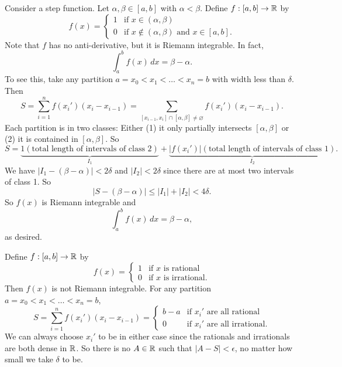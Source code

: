 \begin{example}
  Consider a step function.
  Let $\alpha, \beta \in [a, b]$ with $\alpha < \beta$.
  Define $f : [a, b] \to \mathbb{R}$ by
  \[
    f(x) = \begin{cases}
      1 & \text{if } x \in (\alpha, \beta) \\
      0 & \text{if } x \notin (\alpha, \beta) \text{ and } x \in [a, b].
    \end{cases}
  \]
  Note that $f$ has no anti-derivative, but it
  is Riemann integrable. In fact,
  \[
    \int_a^b f(x)\, dx = \beta - \alpha.
  \]
  To see this, take any partition
  $a = x_0 < x_1 < \dots < x_n = b$ with width less
  than $\delta$. Then
  \[
    S = \sum_{i = 1}^n f(x_i') (x_i - x_{i - 1}) =
    \sum_{[x_{i - 1}, x_i] \cap [\alpha, \beta] \ne \varnothing} f(x_i') (x_i - x_{i - 1}).
  \]
  Each partition is in two classes: Either (1) it
  only partially intersects $[\alpha, \beta]$ or (2)
  it is contained in $[\alpha, \beta]$. So
  \[
    S = \underbrace{1 (\text{total length of intervals of class 2})}_{I_1}
    + \underbrace{|f(x_i')| (\text{total length of intervals of class 1})}_{I_2}.
  \]
  We have $|I_1 - (\beta - \alpha)| < 2 \delta$ and
  $|I_2| < 2\delta$ since there are at most two intervals
  of class 1. So
  \[
    |S - (\beta - \alpha)| \le |I_1| + |I_2| < 4\delta.
  \]
  So $f(x)$ is Riemann integrable and
  \[
    \int_a^b f(x)\, dx = \beta - \alpha,
  \]
  as desired.
\end{example}

\begin{example}
  Define $f : [a, b] \to \mathbb{R}$ by
  \[
    f(x) = \begin{cases}
      1 & \text{if $x$ is rational} \\
      0 & \text{if $x$ is irrational}.
    \end{cases}
  \]
  Then $f(x)$ is not Riemann integrable. For
  any partition $a = x_0 < x_1 < \dots < x_n = b$,
  \[
    S = \sum_{i = 1}^n f(x_i') (x_i - x_{i - 1}) =
    \begin{cases}
      b - a & \text{if $x_i'$ are all rational} \\
      0 & \text{if $x_i'$ are all irrational}.
    \end{cases}
  \]
  We can always choose $x_i'$ to be in either case
  since the rationals and irrationals are both dense
  in $\mathbb{R}$. So there is no $A \in \mathbb{R}$ such that
  $|A - S| < \epsilon$, no matter how small we take
  $\delta$ to be.
\end{example}

